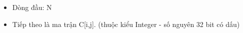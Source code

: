 \begin{itemize}
	\item Dòng đầu: N
	\item Tiếp theo là ma trận C[i,j]. (thuộc kiểu Integer - số nguyên 32 bit có dấu)
\end{itemize}

\